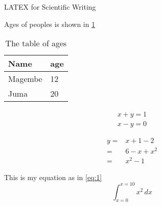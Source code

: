 \documentclass[a4paper,12pt]{report}
\begin{document}
	
{\Huge LATEX for Scientific Writing}



Ages of peoples is shown in \ref{tab:age}
\begin{table}
	\caption{The table of ages}
	\label{tab:age}
	\centering
\begin{tabular}{|l|l|}
	\hline
	\textbf{Name} & \textbf{age} \\
	\hline
	Magembe  & 12 \\\hline
	Juma   & 20 \\
	\hline
\end{tabular}
\end{table}











\begin{align}
x + y = 1 \\
x - y = 0
\end{align}

\begin{align*}
y  =& x + 1 - 2\\
 = &6-x + x^2\\
  =&x^2 -1
\end{align*}




This is my equation  as in \ref{eq:1}
\begin{equation}\label{eq:1}
\int_{x=0}^{x=10} x^2 \, dx
\end{equation}





	
\end{document}
